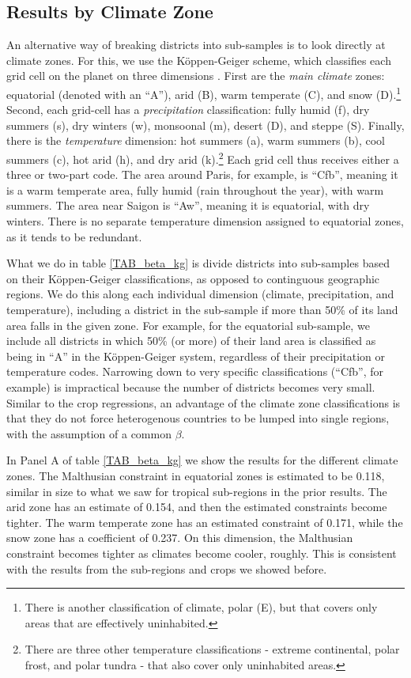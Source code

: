 \documentclass[11pt]{article}
\begin{document}
\subsection{Results by Climate Zone}
An alternative way of breaking districts into sub-samples is to look directly at climate zones. For this, we use the K{\"o}ppen-Geiger scheme, which classifies each grid cell on the planet on three dimensions \citep{kottek2006}. First are the \textit{main climate} zones: equatorial (denoted with an ``A''), arid (B), warm temperate (C), and snow (D).\footnote{There is another classification of climate, polar (E), but that covers only areas that are effectively uninhabited.} Second, each grid-cell has a \textit{precipitation} classification: fully humid (f), dry summers (s), dry winters (w), monsoonal (m), desert (D), and steppe (S). Finally, there is the \textit{temperature} dimension: hot summers (a), warm summers (b), cool summers (c), hot arid (h), and dry arid (k).\footnote{There are three other temperature classifications - extreme continental, polar frost, and polar tundra - that also cover only uninhabited areas.} Each grid cell thus receives either a three or two-part code. The area around Paris, for example, is ``Cfb'', meaning it is a warm temperate area, fully humid (rain throughout the year), with warm summers. The area near Saigon is ``Aw'', meaning it is equatorial, with dry winters. There is no separate temperature dimension assigned to equatorial zones, as it tends to be redundant.

What we do in table \ref{TAB_beta_kg} is divide districts into sub-samples based on their K{\"o}ppen-Geiger classifications, as opposed to continguous geographic regions. We do this along each individual dimension (climate, precipitation, and temperature), including a district in the sub-sample if more than 50\% of its land area falls in the given zone. For example, for the equatorial sub-sample, we include all districts in which 50\% (or more) of their land area is classified as being in ``A'' in the K{\"o}ppen-Geiger system, regardless of their precipitation or temperature codes. Narrowing down to very specific classifications (``Cfb'', for example) is impractical because the number of districts becomes very small. Similar to the crop regressions, an advantage of the climate zone classifications is that they do not force heterogenous countries to be lumped into single regions, with the assumption of a common $\beta$. 

In Panel A of table \ref{TAB_beta_kg} we show the results for the different climate zones. The Malthusian constraint in equatorial zones is estimated to be 0.118, similar in size to what we saw for tropical sub-regions in the prior results. The arid zone has an estimate of 0.154, and then the estimated constraints become tighter. The warm temperate zone has an estimated constraint of 0.171, while the snow zone has a coefficient of 0.237. On this dimension, the Malthusian constraint becomes tighter as climates become cooler, roughly. This is consistent with the results from the sub-regions and crops we showed before. 
\end{document}
